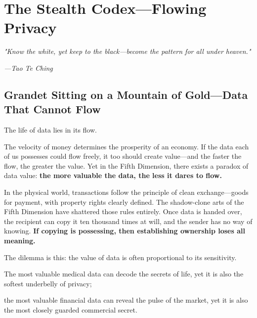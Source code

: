 \chapter{The Stealth Codex---Flowing Privacy}


\begin{myquote}
\textit{"Know the white, yet keep to the black---become the pattern for all under heaven."}

\hfill\textit{---Tao Te Ching}
\end{myquote}

\section{Grandet Sitting on a Mountain of Gold---Data That Cannot Flow}

The life of data lies in its flow.

The velocity of money determines the prosperity of an economy. If the data each of us possesses could flow freely, it too should create value---and the faster the flow, the greater the value. Yet in the Fifth Dimension, there exists a paradox of data value: \textbf{the more valuable the data, the less it dares to flow.}

\vspace{1em}

In the physical world, transactions follow the principle of clean exchange---goods for payment, with property rights clearly defined.
The shadow-clone arts of the Fifth Dimension have shattered those rules entirely.
Once data is handed over, the recipient can copy it ten thousand times at will, and the sender has no way of knowing.
\textbf{If copying is possessing, then establishing ownership loses all meaning.}

\vspace{1em}

The dilemma is this: the value of data is often proportional to its sensitivity.

The most valuable medical data can decode the secrets of life, yet it is also the softest underbelly of privacy;

the most valuable financial data can reveal the pulse of the market, yet it is also the most closely guarded commercial secret.

